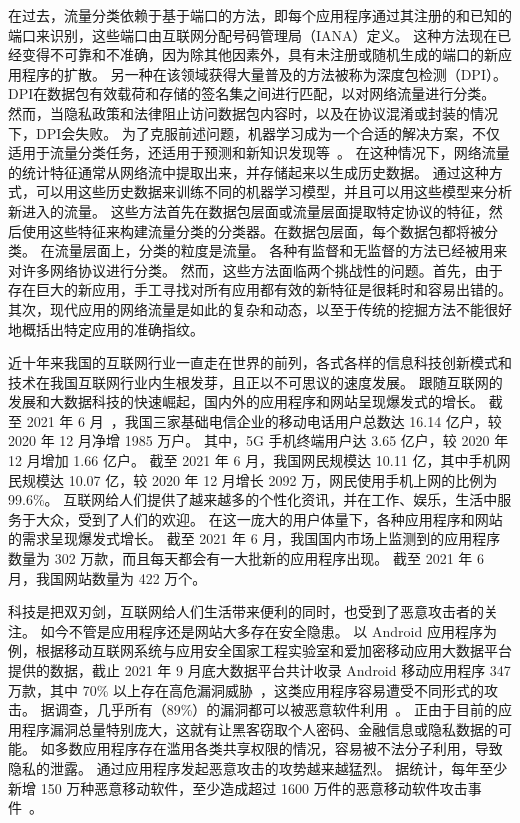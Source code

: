 \documentclass[degree=master,cjk-font=noto]{thuthesis}
\begin{document}
在过去，流量分类依赖于基于端口的方法，即每个应用程序通过其注册的和已知的端口来识别，这些端口由互联网分配号码管理局（IANA）定义。
这种方法现在已经变得不可靠和不准确，因为除其他因素外，具有未注册或随机生成的端口的新应用程序的扩散。
另一种在该领域获得大量普及的方法被称为深度包检测（DPI）。
DPI在数据包有效载荷和存储的签名集之间进行匹配，以对网络流量进行分类。
然而，当隐私政策和法律阻止访问数据包内容时，以及在协议混淆或封装的情况下，DPI会失败。
为了克服前述问题，机器学习成为一个合适的解决方案，不仅适用于流量分类任务，还适用于预测和新知识发现等~\cite{net2,net3,app_class,SDN_HGW,DMTCS,bitcoding}。
在这种情况下，网络流量的统计特征通常从网络流中提取出来，并存储起来以生成历史数据。
通过这种方式，可以用这些历史数据来训练不同的机器学习模型，并且可以用这些模型来分析新进入的流量。
这些方法首先在数据包层面或流量层面提取特定协议的特征，然后使用这些特征来构建流量分类的分类器。在数据包层面，每个数据包都将被分类。
在流量层面上，分类的粒度是流量。
各种有监督和无监督的方法已经被用来对许多网络协议进行分类。
然而，这些方法面临两个挑战性的问题。首先，由于存在巨大的新应用，手工寻找对所有应用都有效的新特征是很耗时和容易出错的。
其次，现代应用的网络流量是如此的复杂和动态，以至于传统的挖掘方法不能很好地概括出特定应用的准确指纹。

近十年来我国的互联网行业一直走在世界的前列，各式各样的信息科技创新模式和技术在我国互联网行业内生根发芽，且正以不可思议的速度发展。
跟随互联网的发展和大数据科技的快速崛起，国内外的应用程序和网站呈现爆发式的增长。
截至 2021 年 6 月~\cite{CNNIC-report}，我国三家基础电信企业的移动电话用户总数达 16.14 亿户，较 2020 年 12 月净增 1985 万户。
其中，5G 手机终端用户达 3.65 亿户，较 2020 年 12 月增加 1.66 亿户。
截至 2021 年 6 月，我国网民规模达 10.11 亿，其中手机网民规模达 10.07 亿，较 2020 年 12 月增长 2092 万，网民使用手机上网的比例为 99.6\%。
互联网给人们提供了越来越多的个性化资讯，并在工作、娱乐，生活中服务于大众，受到了人们的欢迎。
在这一庞大的用户体量下，各种应用程序和网站的需求呈现爆发式增长。
截至 2021 年 6 月，我国国内市场上监测到的应用程序数量为 302 万款，而且每天都会有一大批新的应用程序出现。
截至 2021 年 6 月，我国网站数量为 422 万个。

科技是把双刃剑，互联网给人们生活带来便利的同时，也受到了恶意攻击者的关注。
如今不管是应用程序还是网站大多存在安全隐患。
以 Android 应用程序为例，根据移动互联网系统与应用安全国家工程实验室和爱加密移动应用大数据平台提供的数据，截止 2021 年 9 月底大数据平台共计收录 Android 移动应用程序 347 万款，其中 70\% 以上存在高危漏洞威胁~\cite{App-report}，这类应用程序容易遭受不同形式的攻击。
据调查，几乎所有（89\%）的漏洞都可以被恶意软件利用~\cite{ZOL-report}。
正由于目前的应用程序漏洞总量特别庞大，这就有让黑客窃取个人密码、金融信息或隐私数据的可能。
如多数应用程序存在滥用各类共享权限的情况，容易被不法分子利用，导致隐私的泄露。
通过应用程序发起恶意攻击的攻势越来越猛烈。
据统计，每年至少新增 150 万种恶意移动软件，至少造成超过 1600 万件的恶意移动软件攻击事件~\cite{Attack-report}。
\end{document}
